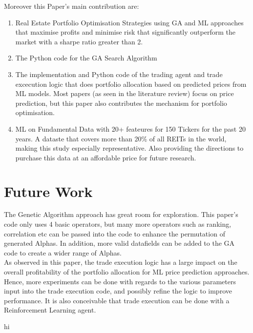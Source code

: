\documentclass[a4paper,12pt]{report}
\numberwithin{equation}{section}
\theoremstyle{definition}
\begin{document}
Moreover this Paper's main contribution are:
\begin{enumerate}
  \item {Real Estate Portfolio Optimisation Strategies using GA and ML approaches that maximise profits and minimise risk that significantly outperform the market with a sharpe ratio greater than 2.}
  \item {The Python code for the GA Search Algorithm}
  \item {The implementation and Python code of the trading agent and trade excecution logic that does portfolio allocation based on predicted prices from ML models. Most papers (as seen in the literature review) focus on price prediction, but this paper also contributes the mechanism for portfolio optimisation.}
  \item {ML on Fundamental Data with 20+ feateures for 150 Tickers for the past 20 years. A dataste that covers more than 20\% of all REITs in the world, making this study especially representative. Also providing the directions to purchase this data at an affordable price for future research.}
\end{enumerate}

\section{Future Work}

The Genetic Algorithm approach has great room for exploration. This paper's code only uses 4 basic operators, but many more operators such as ranking, correlation etc can be passed into the code to enhance the permutation of generated Alphas. In addition, more valid datafields can be added to the GA code to create a wider range of Alphas.\\

As observed in this paper, the trade execution logic has a large impact on the overall profitability of the portfolio allocation for ML price prediction approaches. Hence, more experiments can be done with regards to the various parameters input into the trade execution code, and possibly refine the logic to improve performance. It is also conceivable that trade execution can be done with a Reinforcement Learning agent.

\pagebreak

hi
\cite{sheth_predicting_2023}
\cite{obthong_survey_2020}
\cite{habbab_-depth_2024}
\cite{tostevin_total_2023}
\cite{nareit_global_2024}
\cite{oberlechner_importance_2001}
\cite{tulchinsky_finding_2019}
\cite{wang_alpha-gpt_2023}
\cite{ruse_charles_1975}
\cite{aguilar-rivera_genetic_2015}
\cite{tulchinsky_finding_2019}
\cite{kakushadze_101_2016}
\cite{alexandria_unlocking_2023}
\cite{ross_fundamentals_2021} 
\cite{ariyo_stock_2014}
\cite{habbab_machine_2022}
\cite{obthong_survey_2020} 
\cite{fiszeder_what_2020}
\cite{lama_modelling_2015}
\cite{yuan_garch_2017}
\cite{shakhla_stock_2020}
\cite{dey_comparative_2021} 
\cite{axelsson_univariate_2023}
\cite{cao_fundamental_2021}
\cite{huang_machine_2021}  
\citep{bryant_why_2023}





\end{document}
